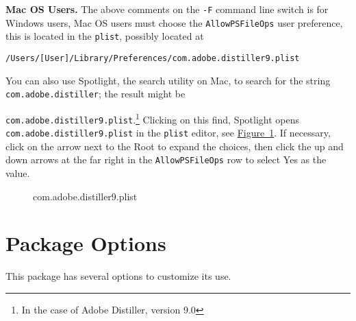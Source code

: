 \documentclass[12pt]{article}
\makeatletter
\renewenvironment{quote}[1][]
   {\def\@rgi{#1}\ifx\@rgi\@empty
    \let\rghtm\@empty\else\def\rghtm{\rightmargin\leftmargin}\fi
    \list{}{\rghtm} %
    \item\relax}
   {\endlist}
\makeatother
\begin{document}
\newtopic \textbf{Mac OS Users.} The above comments on the \texttt{-F} command line switch
is for Windows users, Mac OS users must choose the \texttt{AllowPSFileOps} user preference, this is located
in the \texttt{plist}, possibly located at
\begin{Verbatim}[fontsize=\small]
/Users/[User]/Library/Preferences/com.adobe.distiller9.plist
\end{Verbatim}
You can also use Spotlight, the search utility on Mac, to search for the string \texttt{com.adobe.distiller};
the result might be
\begin{quote}
\texttt{com.adobe.distiller9.plist}.\footnote{In the case of Adobe Distiller, version 9.0}
\end{quote}
Clicking on this find,
Spotlight opens \texttt{com.adobe.distiller9.plist} in the \texttt{plist} editor, see \hyperref[plist]{Figure~\ref*{plist}}.
If necessary, click on the arrow next to the Root to expand the
choices, then click the up and down arrows at the far
right in the \texttt{AllowPSFileOps} row to select Yes as the value.
\begin{figure}[hbt]\setlength{\fboxsep}{0pt}
\begin{center}
\caption{com.adobe.distiller9.plist}\label{plist}
\end{center}
\end{figure}

\section{Package Options}\label{pkgOpts}

This package has several options to customize its use.
\end{document}
